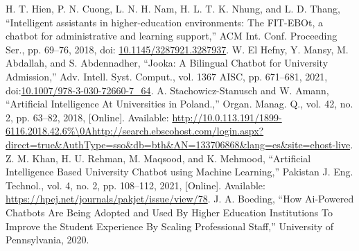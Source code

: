 \documentclass[conference]{IEEEtran}
\begin{document}
\begin{thebibliography}{00}
H. T. Hien, P. N. Cuong, L. N. H. Nam, H. L. T. K. Nhung, and L. D. Thang, “Intelligent assistants in higher-education environments: The FIT-EBOt, a chatbot for administrative and learning support,” ACM Int. Conf. Proceeding Ser., pp. 69–76, 2018, doi: \url{10.1145/3287921.3287937}.
W. El Hefny, Y. Mansy, M. Abdallah, and S. Abdennadher, “Jooka: A Bilingual Chatbot for University Admission,” Adv. Intell. Syst. Comput., vol. 1367 AISC, pp. 671–681, 2021, doi:\url{10.1007/978-3-030-72660-7_64}.
A. Stachowicz-Stanusch and W. Amann, “Artificial Intelligence At Universities in Poland.,” Organ. Manag. Q., vol. 42, no. 2, pp. 63–82, 2018, [Online]. Available: \url{http://10.0.113.191/1899-6116.2018.42.6\%\0Ahttp://search.ebscohost.com/login.aspx?direct=true&AuthType=sso&db=bth&AN=133706868&lang=es&site=ehost-live}.
Z. M. Khan, H. U. Rehman, M. Maqsood, and K. Mehmood, “Artificial Intelligence Based University Chatbot using Machine Learning,” Pakistan J. Eng. Technol., vol. 4, no. 2, pp. 108–112, 2021, [Online]. Available: \url{https://hpej.net/journals/pakjet/issue/view/78}.
J. A. Boeding, “How Ai-Powered Chatbots Are Being Adopted and Used By Higher Education Institutions To Improve the Student Experience By Scaling Professional Staff,” University of Pennsylvania, 2020.
\end{thebibliography}

\end{document}
